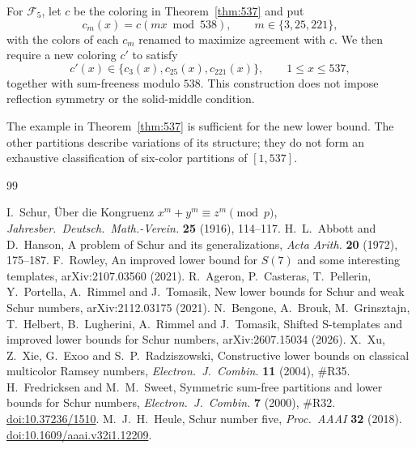 \documentclass[11pt,a4paper]{article}
\theoremstyle{definition}
\begin{document}
For $\mathcal F_5$, let $c$ be the coloring in Theorem~\ref{thm:537} and put
\[
c_m(x)=c(mx\bmod538),\qquad m\in\{3,25,221\},
\]
with the colors of each $c_m$ renamed to maximize agreement with $c$.
We then require a new coloring $c'$ to satisfy
\[
c'(x)\in\{c_3(x),c_{25}(x),c_{221}(x)\},\qquad 1\le x\le537,
\]
together with sum-freeness modulo $538$. This construction does not impose
reflection symmetry or the solid-middle condition.

The example in Theorem~\ref{thm:537} is sufficient for the new lower bound.
The other partitions describe variations of its structure; they do not form an
exhaustive classification of six-color partitions of $[1,537]$.

\begin{thebibliography}{99}
\small\raggedright
{} I.~Schur, \"Uber die Kongruenz $x^m+y^m\equiv z^m \pmod p$,
\emph{Jahresber.\ Deutsch.\ Math.-Verein.} \textbf{25} (1916), 114--117.
 H.~L.~Abbott and D.~Hanson, A problem of Schur and its
generalizations, \emph{Acta Arith.} \textbf{20} (1972), 175--187.
 F.~Rowley, An improved lower bound for $S(7)$ and some interesting
templates, arXiv:2107.03560 (2021).
 R.~Ageron, P.~Casteras, T.~Pellerin, Y.~Portella, A.~Rimmel and
J.~Tomasik, New lower bounds for Schur and weak Schur numbers, arXiv:2112.03175
(2021).
 N.~Bengone, A.~Brouk, M.~Grinsztajn, T.~Helbert, B.~Lugherini,
A.~Rimmel and J.~Tomasik, Shifted S-templates and improved lower bounds for Schur
numbers, arXiv:2607.15034 (2026).
 X.~Xu, Z.~Xie, G.~Exoo and S.~P.~Radziszowski, Constructive lower
bounds on classical multicolor Ramsey numbers, \emph{Electron.\ J.\ Combin.}
\textbf{11} (2004), \#R35.
 H.~Fredricksen and M.~M.~Sweet, Symmetric sum-free partitions and lower
bounds for Schur numbers, \emph{Electron.\ J.\ Combin.} \textbf{7} (2000), \#R32. \href{https://doi.org/10.37236/1510}{doi:10.37236/1510}.
 M.~J.~H.~Heule, Schur number five, \emph{Proc.\ AAAI} \textbf{32}
(2018). \href{https://doi.org/10.1609/aaai.v32i1.12209}{doi:10.1609/aaai.v32i1.12209}.
\end{thebibliography}
\end{document}
